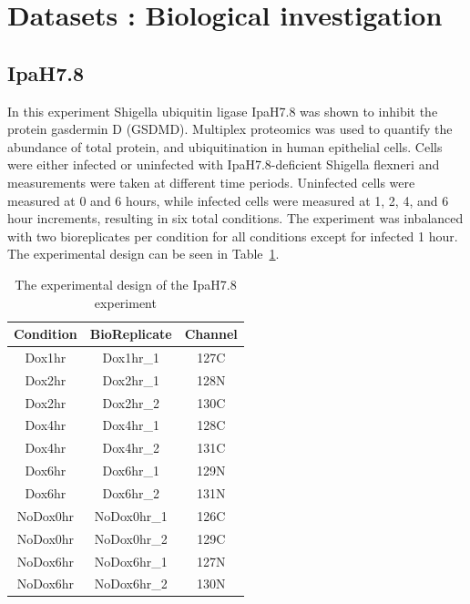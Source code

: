 \documentclass{mcp}
\begin{document}
\clearpage
\section{Datasets : Biological investigation}

\subsection{IpaH7.8}

In this experiment Shigella ubiquitin ligase IpaH7.8 was shown to inhibit the protein gasdermin D (GSDMD). Multiplex proteomics was used to quantify the abundance of total protein, and ubiquitination in human epithelial cells. Cells were either infected or uninfected with IpaH7.8-deficient Shigella flexneri and measurements were taken at different time periods. Uninfected cells were measured at 0 and 6 hours, while infected cells were measured at 1, 2, 4, and 6 hour increments, resulting in six total conditions. The experiment was inbalanced with two bioreplicates per condition for all conditions except for infected 1 hour. The experimental design can be seen in Table~\ref{table:ipah_design}.

\begin{table}[h!]
\centering
\begin{tabular}{| c | c | c |}
\hline
 Condition & BioReplicate & Channel \\ [0.5ex]
 \hline\hline
 Dox1hr & Dox1hr\_1 & 127C\\
 \hline
 Dox2hr & Dox2hr\_1 & 128N\\
\hline
 Dox2hr & Dox2hr\_2 & 130C\\
\hline
 Dox4hr & Dox4hr\_1 & 128C\\
\hline
 Dox4hr & Dox4hr\_2 & 131C\\
\hline
 Dox6hr & Dox6hr\_1 & 129N\\
\hline
 Dox6hr & Dox6hr\_2 & 131N\\
\hline
 NoDox0hr & NoDox0hr\_1 & 126C\\
\hline
 NoDox0hr & NoDox0hr\_2 & 129C\\
\hline
 NoDox6hr & NoDox6hr\_1 & 127N\\
\hline
 NoDox6hr & NoDox6hr\_2 & 130N\\
\hline

\end{tabular}
\caption{The experimental design of the IpaH7.8 experiment}
\label{table:ipah_design}
\end{table}
\end{document}
